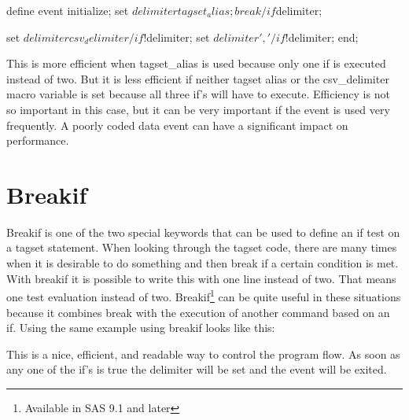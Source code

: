\begin{sfvcode}
        define event initialize;
           set $delimiter tagset_alias;
           break /if $delimiter;

           set $delimiter csv_delimiter /if !$delimiter;
           set $delimiter ','           /if !$delimiter;
        end;
\end{sfvcode}

This is more efficient when tagset\_alias is used because only one if
is executed instead of two.  But it is less efficient if neither tagset
alias or the csv\_delimiter macro variable is set because all three if's
will have to execute.  Efficiency is not so important in this case, but
it can be very important if the event is used very frequently.  A poorly
coded data event can have a significant impact on performance.


\section{Breakif}
Breakif is one of the two special keywords that can be used to define an
if test on a tagset statement.  When looking through the tagset code, 
there are many times when it is desirable to do something and then break
if a certain condition is met.  With breakif it is possible to write this
with one line instead of two.  That means one test evaluation instead of
two.
Breakif\footnote{Available in SAS 9.1 and later} can be quite useful in
these situations because it combines break with the execution of another
command based on an if.  Using the same example using breakif looks like this:

This is a nice, efficient, and readable way to control the program flow.  As
soon as any one of the if's is true the delimiter will be set and the event 
will be exited.

